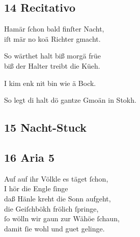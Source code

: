 \documentclass{ees}
\newenvironment{lyrics}[1]{%
  \subsection{#1}\nopagebreak%
  \begin{lyricslist}%
  \let\voice\item%
}{%
  \end{lyricslist}%
}
\begin{document}
\begin{lyrics}{14 Recitativo}
  \voice[Mazko]
  Hamär ſchon bald finſter Nacht,\\
  iſt mär no koä Richter gmacht.

  \voice[Schwabnwürth]
  So wärthet halt biß morgä früe\\
  biß der Halter treibt die Küeh.

  \voice[Barthlme]
  I kim enk nit bin wie ä Bock.

  \voice[alle andern]
  So legt di halt dö gantze Gmoän in Stokh.
\end{lyrics}

\subsection{15 Nacht-Stuck}

\begin{lyrics}{16 Aria 5}
  \voice[Schwabnwürth]
  Auf auf ihr Völkle es täget ſchon,\\
  I hör die Engle ſinge\\
  daß Hänle kreht die Sonn aufgeht,\\
  die Geiſchbökh frölich ſpringe,\\
  ſo wölln wir gaun zur Wähöe ſchaun,\\
  damit ſie wohl und guet gelinge.
\end{lyrics}
\end{document}
